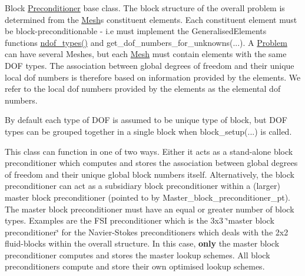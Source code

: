 Block \hyperlink{classoomph_1_1Preconditioner}{Preconditioner} base class. The block structure of the overall problem is determined from the {\ttfamily \hyperlink{classoomph_1_1Mesh}{Mesh}\textquotesingle{}s} constituent elements. Each constituent element must be block-\/preconditionable -\/ i.\+e must implement the {\ttfamily Generalised\+Elements} functions {\ttfamily \hyperlink{classoomph_1_1BlockPreconditioner_ab6cca480686ea8e44244ac60a0db23ba}{ndof\+\_\+types()}} and get\+\_\+dof\+\_\+numbers\+\_\+for\+\_\+unknowns(...). A {\ttfamily \hyperlink{classoomph_1_1Problem}{Problem}} can have several {\ttfamily Meshes}, but each {\ttfamily \hyperlink{classoomph_1_1Mesh}{Mesh}} must contain elements with the same D\+OF types. The association between global degrees of freedom and their unique local dof numbers is therefore based on information provided by the elements. We refer to the local dof numbers provided by the elements as the elemental dof numbers.

By default each type of D\+OF is assumed to be unique type of block, but D\+OF types can be grouped together in a single block when block\+\_\+setup(...) is called.

This class can function in one of two ways. Either it acts as a stand-\/alone block preconditioner which computes and stores the association between global degrees of freedom and their unique global block numbers itself. Alternatively, the block preconditioner can act as a subsidiary block preconditioner within a (larger) master block preconditioner (pointed to by Master\+\_\+block\+\_\+preconditioner\+\_\+pt). The master block preconditioner must have an equal or greater number of block types. Examples are the F\+SI preconditioner which is the 3x3 \char`\"{}master block preconditioner\char`\"{} for the Navier-\/\+Stokes preconditioners which deals with the 2x2 fluid-\/blocks within the overall structure. In this case, {\bfseries only} the master block preconditioner computes and stores the master lookup schemes. All block preconditioners compute and store their own optimised lookup schemes.

